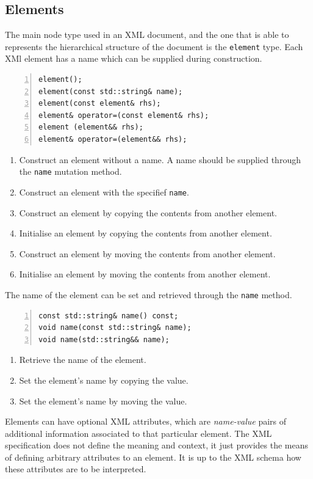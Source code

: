 \documentclass[10pt,a4paper,openany]{mudbook}
\makeatletter
\newcommand{\indextt}[2][]{\texttt{#2}\index{#2@\texttt{#2}#1}}
\newenvironment{enumeratedef}
  {\begin{enumerate}[topsep=0.5em,itemsep=0em,parsep=0em,font=\small]
     \small}
  {\end{enumerate}}
\makeatother
\begin{document}
\subsection{Elements}

The main node type used in an XML document, and the one that is able to
represents the hierarchical structure of the document is the
\indextt{element} type. Each XMl element has a name which can be supplied
during construction.

\begin{lstlisting}[style=definition,numbers=left]
element();
element(const std::string& name);
element(const element& rhs);
element& operator=(const element& rhs);
element (element&& rhs);
element& operator=(element&& rhs);
\end{lstlisting}
\begin{enumeratedef}
  \item Construct an element without a name. A name should be supplied
        through the \texttt{name} mutation method.
  \item Construct an element with the specifief \texttt{name}.
  \item Construct an element by copying the contents from another element.
  \item Initialise an element by copying the contents from another element.
  \item Construct an element by moving the contents from another element.
  \item Initialise an element by moving the contents from another element.
\end{enumeratedef}

The name of the element can be set and retrieved through the \indextt{name}
method.

\begin{lstlisting}[style=definition,numbers=left]
const std::string& name() const;
void name(const std::string& name);
void name(std::string&& name);
\end{lstlisting}
\begin{enumeratedef}
  \item Retrieve the name of the element.
  \item Set the element's name by copying the value.
  \item Set the element's name by moving the value.
\end{enumeratedef}

Elements can have optional XML attributes, which are \textit{name-value}
pairs of additional information associated to that particular element. The
XML specification does not define the meaning and context, it just provides
the means of defining arbitrary attributes to an element. It is up to the
XML schema how these attributes are to be interpreted.
\end{document}
